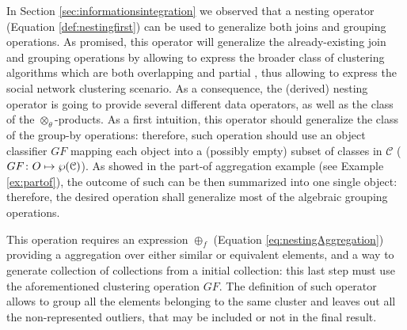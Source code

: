 In Section \vref{sec:informationsintegration} we observed that a nesting operator (Equation \vref{def:nestingfirst}) can be used to generalize both joins and grouping operations. As promised, this operator will generalize the already-existing join and grouping operations by allowing to express the broader class of clustering algorithms which are both overlapping and partial \cite{Tan05}, thus allowing to express the social network clustering scenario. As a consequence, the (derived) nesting operator is going to provide several different data operators, as well as the class of the $\otimes_\theta$-products. As a first intuition, this operator should generalize the class of the group-by operations: therefore, such operation should use an
object classifier  $GF$ mapping each object into a (possibly empty) subset of classes in $\mathcal{C}$ ($GF\colon O\mapsto \wp(\mathcal{C})$). As showed in the part-of aggregation example (see Example \vref{ex:partof}), the outcome of such  can be then summarized into one single object: therefore, the desired operation shall generalize most of the algebraic grouping operations.


This operation requires an expression $\oplus_f$ (Equation \vref{eq:nestingAggregation}) providing  a aggregation over either similar or equivalent elements, and a way to generate collection of collections from a initial collection: this last step must use the aforementioned clustering operation $GF$. The definition of such  operator allows to group all the elements belonging to the same cluster and leaves out all the non-represented outliers, that may be included or not in the final result. 
\medskip


